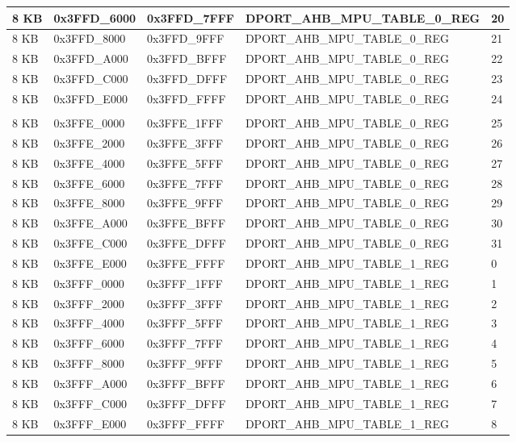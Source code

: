 \begin{longtable}[h]{|p{1.5cm}|p{3cm}|p{3cm}|p{6cm}|p{1.5cm}|}
    \hline
    8 KB & 0x3FFD\_6000 & 0x3FFD\_7FFF & DPORT\_AHB\_MPU\_TABLE\_0\_REG & 20 \\
    \hline
    8 KB & 0x3FFD\_8000 & 0x3FFD\_9FFF & DPORT\_AHB\_MPU\_TABLE\_0\_REG & 21 \\
    \hline
    8 KB & 0x3FFD\_A000 & 0x3FFD\_BFFF & DPORT\_AHB\_MPU\_TABLE\_0\_REG & 22 \\
    \hline
    8 KB & 0x3FFD\_C000 & 0x3FFD\_DFFF & DPORT\_AHB\_MPU\_TABLE\_0\_REG & 23 \\
    \hline
    8 KB & 0x3FFD\_E000 & 0x3FFD\_FFFF & DPORT\_AHB\_MPU\_TABLE\_0\_REG & 24 \\
    \hline
    
    \rowcolor{gray!25}
    \multicolumn{5}{|c|}{片上 SRAM 1} \\
    \hline
    8 KB & 0x3FFE\_0000 & 0x3FFE\_1FFF & DPORT\_AHB\_MPU\_TABLE\_0\_REG & 25 \\
    \hline
    8 KB & 0x3FFE\_2000 & 0x3FFE\_3FFF & DPORT\_AHB\_MPU\_TABLE\_0\_REG & 26 \\
    \hline
    8 KB & 0x3FFE\_4000 & 0x3FFE\_5FFF & DPORT\_AHB\_MPU\_TABLE\_0\_REG & 27 \\
    \hline
    8 KB & 0x3FFE\_6000 & 0x3FFE\_7FFF & DPORT\_AHB\_MPU\_TABLE\_0\_REG & 28 \\
    \hline
    8 KB & 0x3FFE\_8000 & 0x3FFE\_9FFF & DPORT\_AHB\_MPU\_TABLE\_0\_REG & 29 \\
    \hline
    8 KB & 0x3FFE\_A000 & 0x3FFE\_BFFF & DPORT\_AHB\_MPU\_TABLE\_0\_REG & 30 \\
    \hline
    8 KB & 0x3FFE\_C000 & 0x3FFE\_DFFF & DPORT\_AHB\_MPU\_TABLE\_0\_REG & 31 \\
    \hline
    8 KB & 0x3FFE\_E000 & 0x3FFE\_FFFF & DPORT\_AHB\_MPU\_TABLE\_1\_REG & 0 \\
    \hline
    8 KB & 0x3FFF\_0000 & 0x3FFF\_1FFF & DPORT\_AHB\_MPU\_TABLE\_1\_REG & 1 \\
    \hline
    8 KB & 0x3FFF\_2000 & 0x3FFF\_3FFF & DPORT\_AHB\_MPU\_TABLE\_1\_REG & 2 \\
    \hline
    8 KB & 0x3FFF\_4000 & 0x3FFF\_5FFF & DPORT\_AHB\_MPU\_TABLE\_1\_REG & 3 \\
    \hline
    8 KB & 0x3FFF\_6000 & 0x3FFF\_7FFF & DPORT\_AHB\_MPU\_TABLE\_1\_REG & 4 \\
    \hline
    8 KB & 0x3FFF\_8000 & 0x3FFF\_9FFF & DPORT\_AHB\_MPU\_TABLE\_1\_REG & 5 \\
    \hline
    8 KB & 0x3FFF\_A000 & 0x3FFF\_BFFF & DPORT\_AHB\_MPU\_TABLE\_1\_REG & 6 \\
    \hline
    8 KB & 0x3FFF\_C000 & 0x3FFF\_DFFF & DPORT\_AHB\_MPU\_TABLE\_1\_REG & 7 \\
    \hline
    8 KB & 0x3FFF\_E000 & 0x3FFF\_FFFF & DPORT\_AHB\_MPU\_TABLE\_1\_REG & 8 \\
    
\end{longtable}
